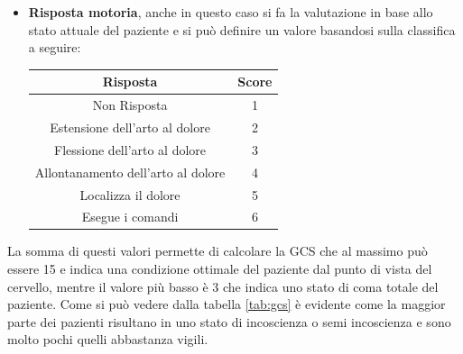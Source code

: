 \begin{itemize}
	\item \textbf{Risposta motoria}, anche in questo caso si fa la valutazione in base allo stato attuale del paziente e si può definire un valore basandosi sulla classifica a seguire:
	
	\begin{center}
		\begin{tabular}{|c|c|}
			\hline
			\textbf{Risposta}&\textbf{Score}\\
			\hline
			Non Risposta & 1 \\
			\hline
			Estensione dell'arto al dolore & 2 \\
			\hline
			Flessione dell'arto al dolore & 3 \\
			\hline
			Allontanamento dell'arto al dolore & 4 \\
			\hline	
			Localizza il dolore & 5\\
			\hline	
			Esegue i comandi & 6\\
			\hline	 
		\end{tabular}
	\end{center}
\end{itemize}

La somma di questi valori permette di calcolare la GCS che al massimo può essere 15 e indica una condizione ottimale del paziente dal punto di vista del cervello, mentre il valore più basso è 3 che indica uno stato di coma totale del paziente.
Come si può vedere dalla tabella \ref{tab:gcs} è evidente come la maggior parte dei pazienti risultano in uno stato di incoscienza o semi incoscienza e sono molto pochi quelli abbastanza vigili.

